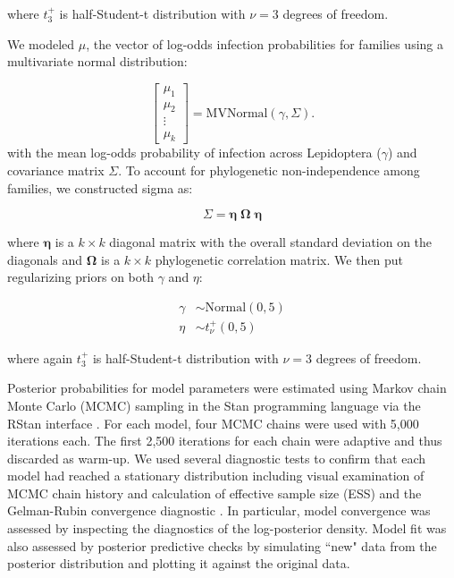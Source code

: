 \documentclass{frontiersSCNS}
\begin{document}
where $t_{3}^{+}$ is half-Student-t distribution with $\nu=3$ degrees of freedom. 

We modeled $\mu$, the vector of log-odds infection probabilities for families using a multivariate normal distribution:

\begin{equation}
	\begin{bmatrix}
		\mu_{1} \\
        \mu_{2} \\
        \vdots \\
        \mu_{k}
	\end{bmatrix}
    = 
    \textrm{MVNormal}(\gamma, \Sigma).
\end{equation}
with the mean log-odds probability of infection across Lepidoptera ($\gamma$) and covariance matrix $\Sigma$. To account for phylogenetic non-independence among families, we constructed sigma as:

\begin{equation}
	\Sigma = \boldsymbol{\eta} \;	\boldsymbol{\Omega} \; \boldsymbol{\eta}
\end{equation}

where $\boldsymbol{\eta}$ is a $k \times k$ diagonal matrix with the overall standard deviation on the diagonals and $\boldsymbol{\Omega}$ is a $k \times k$ phylogenetic correlation matrix. We then put regularizing priors on both $\gamma$ and $\eta$:

\begin{align}
	\gamma 	&\sim \mathrm{Normal}(0, 5) \nonumber \\
	\eta   	&\sim t_{\nu}^{+}(0,5)
\end{align}

where again $t_{3}^{+}$ is half-Student-t distribution with $\nu=3$ degrees of freedom. 

Posterior probabilities for model parameters were estimated using Markov chain Monte Carlo (MCMC) sampling in the Stan programming language \citep{Carpenter:2016aa} via the RStan interface \citep{stan:2016aa}. For each model, four MCMC chains were used with 5,000 iterations each. The first 2,500 iterations for each chain were adaptive and thus discarded as warm-up. We used several diagnostic tests to confirm that each model had reached a stationary distribution including visual examination of MCMC chain history and calculation of effective sample size (ESS) and the Gelman-Rubin convergence diagnostic \citep[$\hat{R}$; ][]{Gelman:1992aa,Brooks:1998aa}. In particular, model convergence was assessed by inspecting the diagnostics of the log-posterior density. Model fit was also assessed by posterior predictive checks by simulating ``new" data from the posterior distribution and plotting it against the original data. %
\end{document}
